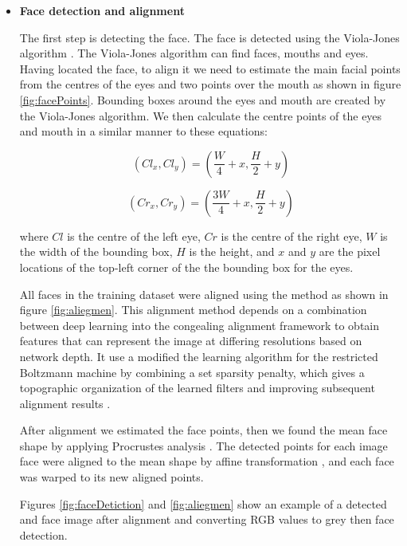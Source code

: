 \begin{itemize}
	\item \textbf{Face detection and alignment}
	
	The first step is detecting the face. The face is detected using the Viola-Jones algorithm \citep{viola2004robust,viola2001rapid}.
	The Viola-Jones algorithm can find faces, mouths and eyes. Having located the face, to align it we need to estimate the main facial points from the centres of the eyes and two points over the mouth as shown in figure \ref{fig:facePoints}. Bounding boxes around the eyes and mouth are created by the Viola-Jones algorithm. We then calculate the centre points of the eyes and mouth in a similar manner to \citep{davison2014micro} these equations:
	
	\begin{equation}
	(Cl_{x}, Cl_{y}) = (\frac{W}{4} + x, \frac{H}{2} + y)
	\end{equation}
	
	
	\begin{equation}
	(Cr_{x}, Cr_{y}) = (\frac{3W}{4}  + x, \frac{H}{2} + y)
	\end{equation}
	
	where $Cl$ is the centre of the left eye, $Cr$ is the centre of the right eye, $W$ is the width of the bounding box, $H$  is the height, and $x$ and $y$ are the pixel locations of the top-left corner of the
	the bounding box for the eyes.
	
	
	
	All faces in the training dataset were aligned using the \cite{huang2012learning} method as shown in figure \ref{fig:aliegmen}. This alignment method depends on a combination between deep learning into the congealing alignment framework to obtain features that can represent the image at differing resolutions based on network depth. It use a  modified the learning algorithm for the restricted Boltzmann machine by combining a set sparsity penalty, which gives a topographic organization of the learned filters and improving subsequent alignment results \cite{huang2012learning}.
	
	 After alignment we estimated the face points, then we found the mean face shape by applying Procrustes analysis \citep{kendall1989survey}.  The detected points for each image face were aligned to the mean shape by affine transformation \citep{hazewinkel2001affine}, and each face was warped to its new aligned points.
	
	Figures \ref{fig:faceDetiction} and  \ref{fig:aliegmen} show an example of a detected and  face image after alignment and converting RGB values to grey then face detection.   
	

\end{itemize}
